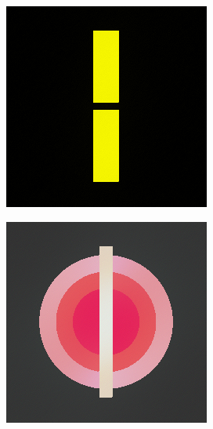 \begin{figure}[H]
    \centering
    \begin{subfigure}{0.4\linewidth}
        \centering
        \includegraphics[width=0.8\linewidth]{image/result_ex1/timemarch01.png}
    \end{subfigure}
    \begin{subfigure}{0.4\linewidth}
        \centering
        \includegraphics[width=0.8\linewidth]{image/result_ex1/timemarch02.png}
    \end{subfigure}
    \begin{subfigure}{0.4\linewidth}

\end{subfigure}
\end{figure}

